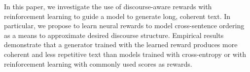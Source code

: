 In this paper, we investigate the use of discourse-aware rewards with reinforcement learning to guide a model to generate long, coherent text. In particular, we propose to learn neural rewards to model cross-sentence ordering as a means to approximate desired discourse structure. Empirical results demonstrate that a generator trained with the learned reward produces more coherent and less repetitive text than models trained with cross-entropy or with reinforcement learning with commonly used scores as rewards.
